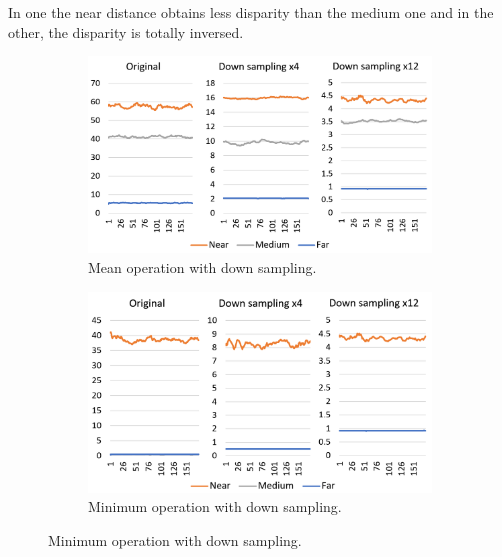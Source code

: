 \documentclass[10pt,a4paper,twocolumn,twoside]{article}
\begin{document}
	In one the near distance obtains less disparity than the medium one and in the other, the disparity is totally inversed.

	\begin{figure}
		\centering
		\begin{subfigure}[t]{0.5\textwidth}
			\centering
			\includegraphics[width=\linewidth]{img/mean2.png}
			\caption{Mean operation with down sampling.\newline}
			\label{fig:output:mean}
		\end{subfigure}
	
		\begin{subfigure}[t]{0.5\textwidth}
			\centering
			\includegraphics[width=\linewidth]{img/min2.png}
			\caption{Minimum operation with down sampling.\newline}
			\label{fig:output:min}
		\end{subfigure}


\end{figure}
\end{document}
